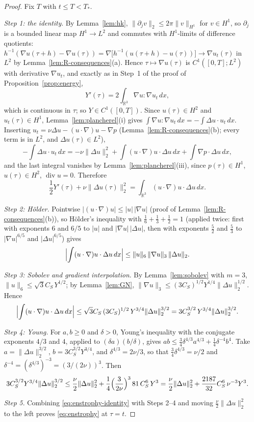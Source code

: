 \documentclass[11pt]{article}
\theoremstyle{definition}
\theoremstyle{plain}
\newcommand{\R}{\mathbb R}
\newcommand{\norm}[1]{\lVert #1\rVert}
\begin{document}
\begin{proof}
Fix $T$ with $t\le T<T_*$.

\emph{Step 1: the identity.}  By Lemma~\ref{lem:hk},
$\|\partial_jv\|_2\le2\pi\|v\|_{H^1}$ for $v\in H^1$, so $\partial_j$ is a
bounded linear map $H^1\to L^2$ and commutes with $H^1$-limits of difference
quotients:
$h^{-1}(\nabla u(\tau+h)-\nabla u(\tau))=\nabla\bigl[h^{-1}(u(\tau+h)-u(\tau))\bigr]
\to\nabla u_t(\tau)$ in $L^2$ by Lemma~\ref{lem:R-consequences}(a).  Hence
$\tau\mapsto\nabla u(\tau)$ is $C^1([0,T];L^2)$ with derivative
$\nabla u_t$, and exactly as in Step~1 of the proof of
Proposition~\ref{prop:energy},
\[
 Y'(\tau)=2\int_{\R^3}\nabla u:\nabla u_t\,dx ,
\]
which is continuous in $\tau$; so $Y\in C^1([0,T])$.  Since
$u(\tau)\in H^2$ and $u_t(\tau)\in H^1$, Lemma~\ref{lem:plancherel}(i)
gives $\int\nabla u:\nabla u_t\,dx=-\int\Delta u\cdot u_t\,dx$.  Inserting
$u_t=\nu\Delta u-(u\cdot\nabla)u-\nabla p$ (Lemma~\ref{lem:R-consequences}(b);
every term is in $L^2$, and $\Delta u(\tau)\in L^2$),
\[
 -\int\Delta u\cdot u_t\,dx
 =-\nu\|\Delta u\|_2^2+\int(u\cdot\nabla)u\cdot\Delta u\,dx
  +\int\nabla p\cdot\Delta u\,dx ,
\]
and the last integral vanishes by Lemma~\ref{lem:plancherel}(iii), since
$p(\tau)\in H^1$, $u(\tau)\in H^2$, $\operatorname{div}u=0$.  Therefore
\begin{equation}\label{eq:enstrophy-identity}
 \frac12Y'(\tau)+\nu\norm{\Delta u(\tau)}_2^2
 =\int_{\R^3}(u\cdot\nabla)u\cdot\Delta u\,dx .
\end{equation}

\emph{Step 2: H\"older.}  Pointwise $|(u\cdot\nabla)u|\le|u|\,|\nabla u|$
(proof of Lemma~\ref{lem:R-consequences}(b)), so H\"older's inequality with
$\frac16+\frac13+\frac12=1$ (applied twice: first with exponents $6$ and
$6/5$ to $|u|$ and $|\nabla u|\,|\Delta u|$, then with exponents
$\frac{5}{2}$ and $\frac53$ to $|\nabla u|^{6/5}$ and $|\Delta u|^{6/5}$)
gives
\[
 \Bigl|\int(u\cdot\nabla)u\cdot\Delta u\,dx\Bigr|
 \le\|u\|_6\,\|\nabla u\|_3\,\|\Delta u\|_2 .
\]

\emph{Step 3: Sobolev and gradient interpolation.}  By
Lemma~\ref{lem:sobolev} with $m=3$, $\|u\|_6\le\sqrt3C_S\,Y^{1/2}$; by
Lemma~\ref{lem:GN}, $\|\nabla u\|_3\le(3C_S)^{1/2}Y^{1/4}\|\Delta u\|_2^{1/2}$.
Hence
\[
 \Bigl|\int(u\cdot\nabla)u\cdot\Delta u\,dx\Bigr|
 \le\sqrt3C_S\,(3C_S)^{1/2}\,Y^{3/4}\|\Delta u\|_2^{3/2}
 =3C_S^{3/2}\,Y^{3/4}\|\Delta u\|_2^{3/2}.
\]

\emph{Step 4: Young.}  For $a,b\ge0$ and $\delta>0$, Young's inequality
with the conjugate exponents $4/3$ and $4$, applied to $(\delta a)(b/\delta)$,
gives $ab\le\frac34\delta^{4/3}a^{4/3}+\frac14\delta^{-4}b^4$.  Take
$a=\|\Delta u\|_2^{3/2}$, $b=3C_S^{3/2}Y^{3/4}$, and $\delta^{4/3}=2\nu/3$,
so that $\frac34\delta^{4/3}=\nu/2$ and
$\delta^{-4}=(\delta^{4/3})^{-3}=(3/(2\nu))^3$.  Then
\[
 3C_S^{3/2}Y^{3/4}\|\Delta u\|_2^{3/2}
 \le\frac\nu2\|\Delta u\|_2^2+\frac14\Bigl(\frac3{2\nu}\Bigr)^3\,81\,C_S^6\,Y^3
 =\frac\nu2\|\Delta u\|_2^2+\frac{2187}{32}C_S^6\,\nu^{-3}Y^3 .
\]

\emph{Step 5.}  Combining \eqref{eq:enstrophy-identity} with Steps 2--4 and
moving $\frac\nu2\|\Delta u\|_2^2$ to the left proves \eqref{eq:enstrophy}
at $\tau=t$.
\end{proof}
\end{document}
